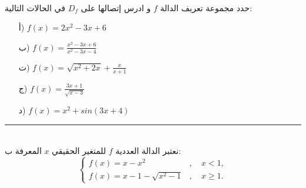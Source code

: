 \documentclass[10pt,a4paper,twocolumn]{arabart}
\begin{document}
 \\
   
حدد مجموعة تعريف الدالة $f$ و ادرس إتصالها على $D_f$ في الحالات التالية:
\begin{itemize}
\item[ أ)] $ f(x)=2x^2-3x+6$
\item[ ب)] $ f(x)=\displaystyle\frac{x^2-3x+6}{x^2-3x-4}$
\item[ ت)] $ f(x)=\sqrt{x^2+2x}+\displaystyle\frac{x}{x+1}$
\item[ ج)] $ f(x)=\displaystyle\frac{3x+1}{\sqrt{x-3}}$
\item[ د)] $ f(x)=x^2+sin(3x+4)$
\end{itemize}
 \hrule
{}\\
    نعتبر الدالة العددية $f$ للمتغير الحقيقي $x$ المعرفة ب:\\
    \begin{displaymath}
 \left\{
    \begin{array}{ll}
       f(x)=x-x^2    &, \quad x<1,\\
      f(x)=x-1-\sqrt{x^2-1}   &,\quad x\geqslant 1.
    \end{array}
\right.
\end{displaymath}
\end{document}
